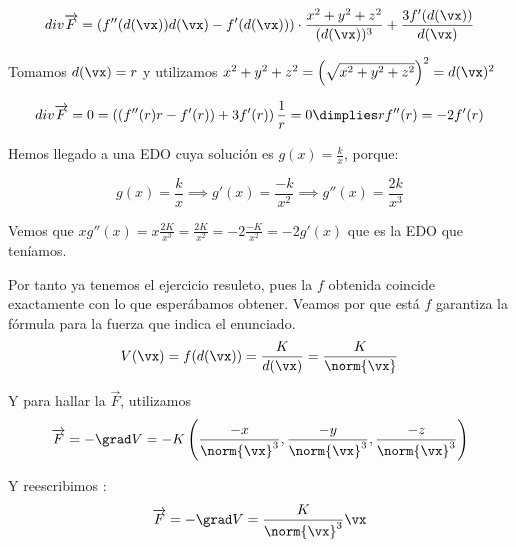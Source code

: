 \begin{problem}[4]
$$div \overrightarrow{F} = \left(f''(d(\vx)) d(\vx) - f'(d(\vx))\right) \cdot \frac{x^2 + y^2 + z^2}{(d(\vx))^3} + \frac{3f'(d(\vx))}{d(\vx)}$$

Tomamos $d(\vx) = r$ y utilizamos $x^2+y^2+z^2 = \left(\sqrt{x^2+y^2+z^2}\right)^2 = d(\vx)^2$

$$ div \overrightarrow{F} = 0 = \left((f''(r)r - f'(r)) + 3f'(r)\right) \frac{1}{r} = 0 \dimplies r f''(r) = -2 f'(r)$$

Hemos llegado a una EDO cuya solución es $g(x) = \frac{k}{x}$, porque:

$$g(x) = \frac{k}{x} \implies g'(x) = \frac{-k}{x^2} \implies g''(x) = \frac{2k}{x^3}$$

Vemos que $x g''(x) = x\frac{2K}{x^3} = \frac{2K}{x^2} = -2 \frac{-K}{x^2} = -2 g'(x)$ que es la EDO que teníamos.

Por tanto ya tenemos el ejercicio resuleto, pues la $f$ obtenida coincide exactamente con lo que esperábamos obtener. Veamos por que está $f$ garantiza la fórmula para la fuerza que indica el enunciado.
$$V(\vx) = f(d(\vx)) = \frac{K}{d(\vx)} = \frac{K}{\norm{\vx}}$$

Y para hallar la $\overrightarrow{F}$, utilizamos $$\overrightarrow{F} = - \grad V = -K\left(\frac{-x}{\norm{\vx}^{3}},\frac{-y}{\norm{\vx}^{3}},\frac{-z}{\norm{\vx}^{3}} \right)$$

Y reescribimos : $$\overrightarrow{F} = - \grad V = \frac{K}{\norm{\vx}^3} \vx$$

\end{problem}

